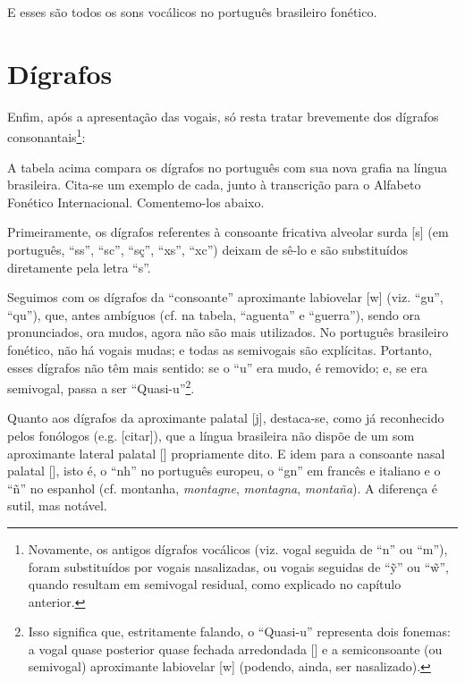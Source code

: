 \documentclass[12pt, a5paper, titlepage]{article}
\begin{document}
\begin{bilingualpages}
    E esses são todos os sons vocálicos no português brasileiro fonético.



    \section{Dígrafos}\label{pt.section.digraphs}
    Enfim, após a apresentação das vogais, só resta tratar brevemente dos dígrafos consonantais\footnote{
        Novamente, os antigos dígrafos vocálicos (viz. vogal seguida de ``n'' ou ``m''), foram substituídos por vogais nasalizadas, ou vogais seguidas de ``\~y'' ou ``\~w'', quando resultam em semivogal residual, como explicado no capítulo anterior.
    }:

    \PtTableDigraphs

    A tabela acima compara os dígrafos no português com sua nova grafia na língua brasileira. Cita-se um exemplo de cada, junto à transcrição para o Alfabeto Fonético Internacional. Comentemo-los abaixo.

    Primeiramente, os dígrafos referentes à consoante fricativa alveolar surda [s] (em português, ``ss'', ``sc'', ``sç'', ``xs'', ``xc'') deixam de sê-lo e são substituídos diretamente pela letra ``s''.

    Seguimos com os dígrafos da ``consoante'' aproximante labiovelar [w] (viz. ``gu'', ``qu''), que, antes ambíguos (cf. na tabela,   ``aguenta'' e ``guerra''), sendo ora pronunciados, ora mudos, agora não são mais utilizados. No português brasileiro fonético, não há vogais mudas; e todas as semivogais são explícitas. Portanto, esses dígrafos não têm mais sentido: se o ``u'' era mudo, é removido; e, se era semivogal, passa a ser ``Quasi-u''\footnote{
        Isso significa que, estritamente falando, o ``Quasi-u'' representa dois fonemas: a vogal quase posterior quase fechada arredondada [] e
        a semiconsoante (ou semivogal) aproximante labiovelar [w] (podendo, ainda, ser nasalizado).
    }.

    Quanto aos dígrafos da aproximante palatal [j], destaca-se, como já reconhecido pelos fonólogos (e.g. [citar]), que a língua brasileira não dispõe de um som aproximante lateral palatal [\textturny] propriamente dito. E idem para a consoante nasal palatal [\textltailn], isto é, o ``nh'' no português europeu, o ``gn'' em francês e italiano e o ``ñ'' no espanhol (cf.
    montanha, \textit{montagne}, \textit{montagna}, \textit{montaña}). A diferença é sutil, mas notável.


\end{bilingualpages}
\end{document}
